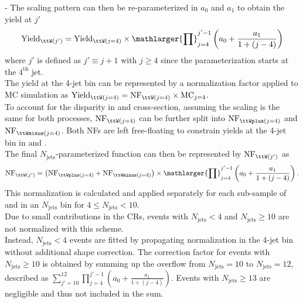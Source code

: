 \documentclass[../thesis.tex]{subfiles}
\begin{document}
- The scaling pattern can then be re-parameterized in $a_0$ and $a_1$ to obtain the \ttW yield at $j'$
\begin{equation}
\mathrm{Yield}_{\ttW(j')} = \mathrm{Yield}_{\ttW(j=4)} \times 
\mathlarger{\prod}_{j=4}^{j'-1} \left( a_0 + \frac{a_1}{1+(j-4)} \right)
\end{equation}
where $j'$ is defined as $j'\equiv j+1$ with $j\geq 4$ since the parameterization starts at the $4^\mathrm{th}$ jet.\\
The \ttW yield at the 4-jet bin can be represented by a normalization factor applied to \ttW MC simulation as $\mathrm{Yield}_{\ttW(j=4)}=\mathrm{NF}_{\ttW(j=4)} \times \mathrm{MC}_{j=4}$.\\
To account for the disparity in \ttWplus and \ttWminus cross-section, assuming the scaling is the same for both processes, $\mathrm{NF}_{\ttW(j=4)}$ can be further split into $\mathrm{NF}_{\ttWplus(j=4)}$ and $\mathrm{NF}_{\ttWminus(j=4)}$. Both NFs are left free-floating to constrain \ttW yields at the 4-jet bin in \CRonebp and \CRonebm.\\
The final $N_\mathrm{jets}$-parameterized function can then be represented by $\mathrm{NF}_{\ttW(j')}$ as
\begin{equation}
\label{eq:ttWdd}
\mathrm{NF}_{\ttW(j')} = \left(\mathrm{NF}_{\ttWplus(j=4)} + \mathrm{NF}_{\ttWminus(j=4)}\right) \times \mathlarger{\prod}_{j=4}^{j'-1} \left( a_0 + \frac{a_1}{1+(j-4)} \right).
\end{equation}
This normalization is calculated and applied separately for each sub-sample of \ttWplus and \ttWminus in an $N_\mathrm{jets}$ bin for $4\leq N_\mathrm{jets}<10$.\\
Due to small contributions in the CRs, events with $N_\mathrm{jets}<4$ and $N_\mathrm{jets}\geq 10$ are not normalized with this scheme.\\
Instead, $N_\mathrm{jets}<4$ \ttW events are fitted by propagating normalization in the 4-jet bin without additional shape correction. The correction factor for \ttW events with $N_\mathrm{jets}\geq 10$ is obtained by summing up the overflow from $N_\mathrm{jets}=10$ to $N_\mathrm{jets}=12$, described as $\sum_{j'=10}^{12} \prod_{j=4}^{j'-1}\left(a_0+\frac{a_1}{1+(j-4)}\right)$. Events with $N_\mathrm{jets}\geq 13$ are negligible and thus not included in the sum.
\end{document}
